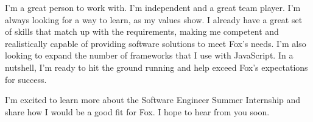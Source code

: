\begin{cvletter}
I'm a great person to work with. I'm independent and a great team player. I'm always
looking for a way to learn, as my values show. I already have a great set of
skills that match up with the requirements, making me competent and
realistically capable of providing software solutions to meet Fox's needs. I'm
also looking to expand the number of frameworks that I use with
JavaScript. In a nutshell, I'm ready to hit the ground running and help exceed
Fox's expectations for success.
\par
I'm excited to learn more about the Software Engineer Summer Internship and
share how I would be a good fit for Fox. I hope to hear from you soon.

\end{cvletter}


\makeletterclosing



